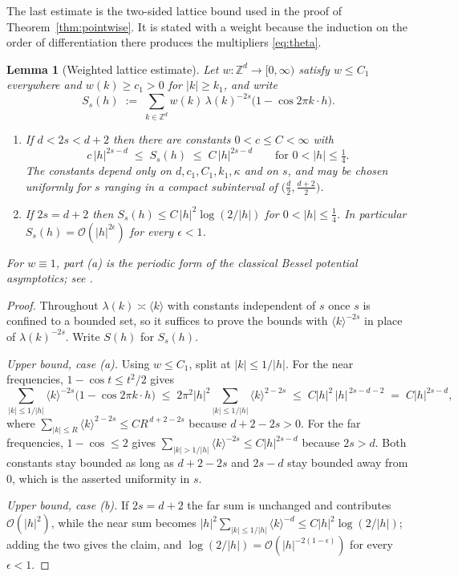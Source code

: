 \documentclass[pdflatex,sn-mathphys,Numbered]{sn-jnl}
\theoremstyle{thmstyleone}%
\newtheorem{lemma}[theorem]{Lemma}%
\theoremstyle{thmstyletwo}%
\theoremstyle{thmstylethree}%
\newcommand{\ZZ}{\mathbb{Z}}
\newcommand{\calO}{\mathcal{O}}
\begin{document}
\begin{appendices}
The last estimate is the two-sided lattice bound used in the proof of
Theorem~\ref{thm:pointwise}. It is stated with a weight because the induction
on the order of differentiation there produces the multipliers
\eqref{eq:theta}.

\begin{lemma}[Weighted lattice estimate]\label{lem:lattice}
Let $w : \ZZ^d \to [0,\infty)$ satisfy $w \leq C_1$ everywhere and
$w(k) \geq c_1 > 0$ for $|k| \geq k_1$, and write
\[
    S_s(h) \;:=\; \sum_{k\in\ZZ^d} w(k)\,\lambda(k)^{-2s}
        \bigl(1-\cos 2\pi k\cdot h\bigr) .
\]
\begin{enumerate}
\item[(a)] If $d < 2s < d+2$ then there are constants $0<c\leq C<\infty$ with
\[
    c\,|h|^{2s-d} \;\leq\; S_s(h) \;\leq\; C\,|h|^{2s-d}
    \qquad \text{for } 0 < |h| \leq \tfrac14 .
\]
The constants depend only on $d,c_1,C_1,k_1,\kappa$ and on $s$, and may be
chosen uniformly for $s$ ranging in a compact subinterval of
$\bigl(\tfrac d2,\tfrac{d+2}2\bigr)$.
\item[(b)] If $2s = d+2$ then $S_s(h) \leq C\,|h|^{2}\log(2/|h|)$ for
$0<|h|\leq\tfrac14$. In particular $S_s(h) = \calO(|h|^{2\epsilon})$ for every
$\epsilon<1$.
\end{enumerate}
For $w \equiv 1$, part (a) is the periodic form of the classical Bessel
potential asymptotics; see \cite{stein}.
\end{lemma}

\begin{proof}
Throughout $\lambda(k) \asymp \langle k\rangle$ with constants independent of
$s$ once $s$ is confined to a bounded set, so it suffices to prove the bounds
with $\langle k\rangle^{-2s}$ in place of $\lambda(k)^{-2s}$. Write $S(h)$ for
$S_s(h)$.

\emph{Upper bound, case \textup{(a)}.} Using $w \leq C_1$, split at $|k| \leq 1/|h|$. For the near
frequencies, $1-\cos t \leq t^2/2$ gives
\[
    \sum_{|k|\leq 1/|h|}\!\!\langle k\rangle^{-2s}\bigl(1-\cos2\pi k\cdot h\bigr)
    \;\leq\; 2\pi^2|h|^2\!\!\sum_{|k|\leq 1/|h|}\!\!\langle k\rangle^{2-2s}
    \;\leq\; C|h|^2\,|h|^{\,2s-d-2} \;=\; C|h|^{2s-d},
\]
where $\sum_{|k|\leq R}\langle k\rangle^{2-2s} \leq CR^{\,d+2-2s}$ because
$d+2-2s>0$. For the far frequencies, $1-\cos \leq 2$ gives
$\sum_{|k|> 1/|h|}\langle k\rangle^{-2s} \leq C|h|^{2s-d}$ because $2s>d$. Both
constants stay bounded as long as $d+2-2s$ and $2s-d$ stay bounded away from
$0$, which is the asserted uniformity in $s$.

\emph{Upper bound, case \textup{(b)}.} If $2s = d+2$ the far sum is unchanged
and contributes $\calO(|h|^{2})$, while the near sum becomes
$|h|^2\sum_{|k|\leq1/|h|}\langle k\rangle^{-d} \leq C|h|^2\log(2/|h|)$; adding
the two gives the claim, and $\log(2/|h|) = \calO(|h|^{-2(1-\epsilon)})$ for
every $\epsilon<1$.


\end{proof}
\end{appendices}
\end{document}
